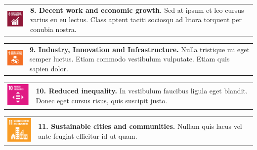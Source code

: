 \begin{multicols}{2}
    \noindent
    \begin{tabular}{p{25mm} p{46mm}}
        \vspace{0mm} \includegraphics[width=2cm]{text/appendix/appendix-sdg/resources/sdg8.pdf} & \vspace{-0.5mm} \textbf{8. Decent work and economic growth.} Sed at ipsum et leo cursus varius eu eu lectus. Class aptent taciti sociosqu ad litora torquent per conubia nostra. \\
    \end{tabular}

    \noindent
    \begin{tabular}{p{25mm} p{46mm}}
        \vspace{0mm} \includegraphics[width=2cm]{text/appendix/appendix-sdg/resources/sdg9.pdf} & \vspace{-0.5mm} \textbf{9. Industry, Innovation and Infrastructure.} Nulla tristique mi eget semper luctus. Etiam commodo vestibulum vulputate. Etiam quis sapien dolor.  \\
    \end{tabular}

    \noindent
    \begin{tabular}{p{25mm} p{46mm}}
        \vspace{0mm} \includegraphics[width=2cm]{text/appendix/appendix-sdg/resources/sdg10.pdf} & \vspace{-0.5mm} \textbf{10. Reduced inequality.} In vestibulum faucibus ligula eget blandit. Donec eget cursus risus, quis suscipit justo. \\
    \end{tabular}

    \noindent
    \begin{tabular}{p{25mm} p{46mm}}
        \vspace{0mm} \includegraphics[width=2cm]{text/appendix/appendix-sdg/resources/sdg11.pdf} & \vspace{-0.5mm} \textbf{11. Sustainable cities and communities.} Nullam quis lacus vel ante feugiat efficitur id ut quam.\\
    \end{tabular}


\end{multicols}
